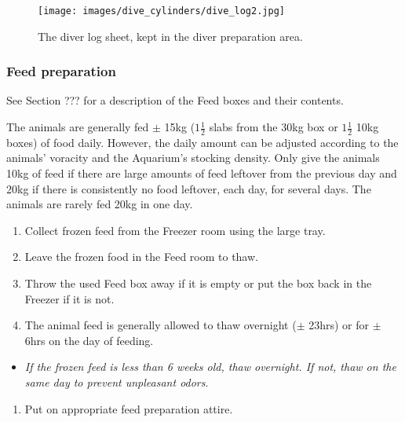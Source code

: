 \documentclass[
  12pt,
]{report}
\providecommand{\tightlist}{%
  \setlength{\itemsep}{0pt}\setlength{\parskip}{0pt}}\usepackage{longtable,booktabs,array}
\begin{document}
\begin{figure}[H]

{\centering \texttt{[image: images/dive\_cylinders/dive\_log2.jpg]}

}

\caption{\label{fig-dive-log}The diver log sheet, kept in the diver
preparation area.}

\end{figure}

\hypertarget{feed-preparation}{%
\subsubsection{Feed preparation}\label{feed-preparation}}

{See Section ??? for a description of the Feed boxes and their
contents}.

The animals are generally fed \(\pm\) 15kg (\(1\frac{1}{2}\) slabs from
the 30kg box or \(1\frac{1}{2}\) 10kg boxes) of food daily. However, the
daily amount can be adjusted according to the animals' voracity and the
Aquarium's stocking density. Only give the animals 10kg of feed if there
are large amounts of feed leftover from the previous day and 20kg if
there is consistently no food leftover, each day, for several days. The
animals are rarely fed 20kg in one day.

\begin{enumerate}
\def\labelenumi{\arabic{enumi}.}
\tightlist
\item
  Collect frozen feed from the Freezer room using the large tray.
\item
  Leave the frozen food in the Feed room to thaw.
\item
  Throw the used Feed box away if it is empty or put the box back in the
  Freezer if it is not.
\item
  The animal feed is generally allowed to thaw overnight (\(\pm\) 23hrs)
  or for \(\pm\) 6hrs on the day of feeding.
\end{enumerate}

\begin{itemize}
\tightlist
\item
  \emph{If the frozen feed is less than 6 weeks old, thaw overnight. If
  not, thaw on the same day to prevent unpleasant odors}.
\end{itemize}

\begin{enumerate}
\def\labelenumi{\arabic{enumi}.}
\setcounter{enumi}{4}
\tightlist
\item
  Put on appropriate feed preparation attire.
\end{enumerate}
\end{document}
